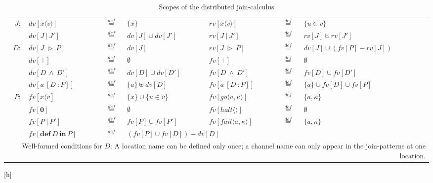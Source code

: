 \begin{table} [h]
  \begin{center}
  \begin{tabular}{ r l c l  l  c l  }
  $J:$&$dv[x\langle\widetilde{v}\rangle]$&$\overset{def}{=}$&$\{x\}$& $rv[x\langle\widetilde{v}\rangle]$&$\overset{def}{=}$&$\{u \in \widetilde{v}\}$\\
  &$dv[J\ |\ J']$&$\overset{def}{=}$&$dv[J]\cup dv[J']$&$rv[J\ |\ J']$&$\overset{def}{=}$&$rv[J]\uplus rv[J']$\\
  $D:$&$dv[J\ \triangleright \ P]$&$\overset{def}{=}$&$dv[J]$&$rv[J\ \triangleright \ P]$&$\overset{def}{=}$&$dv[J]\cup(fv[P]-rv[J])$\\
  &$dv[\top]$&$\overset{def}{=}$&$\emptyset$&$fv[\top]$&$\overset{def}{=}$&$\emptyset$\\
  &$dv[D\ \wedge \ D']$&$\overset{def}{=}$&$dv[D]\cup dv[D']$&$fv[D\ \wedge \ D']$&$\overset{def}{=}$&$fv[D]\cup fv[D']$\\
  &$dv[a\ [D\ : P]]$&$\overset{def}{=}$&$\{a\} \uplus dv[D]$&$fv[a\ [D\ : P]]$&$\overset{def}{=}$&$\{a\} \cup fv[D] \cup fv[P]$\\
  $P:$&$fv[x\langle\widetilde{v}]$&$\overset{def}{=}$&$\{x\}\cup\{u\in\widetilde{v}\}$&$fv[go\langle a, \kappa \rangle]$&$\overset{def}{=}$&$\{a,\kappa\}$\\
  &$fv[\mathbf{0}]$&$\overset{def}{=}$&$\emptyset$&$fv[halt\langle\rangle]$&$\overset{def}{=}$&$\emptyset$\\
  &$fv[P\ |\ P']$&$\overset{def}{=}$&$fv[P]\cup fv[P']$&$fv[fail\langle a, \kappa \rangle]$&$\overset{def}{=}$&$\{a,\kappa\}$\\
  &$fv[ \mathbf{def}\ D\ \mathbf{in}\ P]$&$\overset{def}{=}$&\multicolumn{2}{l}{$(fv[P]\cup fv[D])-dv[D]$}\\
  \multicolumn{7}{p{\textwidth}}{Well-formed conditions for $D$: A location name can be defined only once; a channel name can only appear in the join-patterns at one location.}
  \end{tabular}[h]
  \end{center}
  \caption{Scopes of the distributed join-calculus}
  \label{join_scope}
\end{table}

